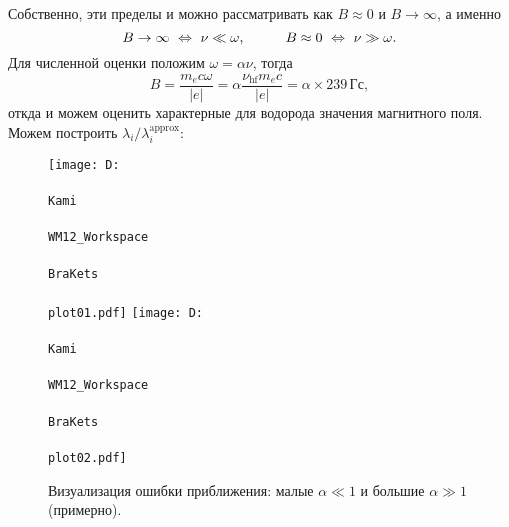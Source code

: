 Собственно, эти пределы и можно рассматривать как $B \approx 0$ и $B \to \infty$, а именно
\begin{equation*}
    B \to \infty \ \Leftrightarrow \ \nu \ll \omega,
    \hspace{10 mm} 
    B \approx 0 \  \Leftrightarrow \ \nu \gg \omega.
\end{equation*}
Для численной оценки положим $\omega = \alpha \nu$, тогда
\begin{equation*}
    B = \frac{m_e c \omega}{|e|} = \alpha \frac{\nu_{\text{hf}} m_e c}{|e|} = \alpha \times 239\, \text{Гс},
\end{equation*}
откда и можем оценить характерные для водорода значения магнитного поля. 
Можем построить $\lambda_i / \lambda_i^{\text{approx}}$:
\begin{figure}[h]
    \centering
    \texttt{[image: D:\\\\Kami\\\\WM12\_Workspace\\\\BraKets\\\\plot01.pdf]}
    \texttt{[image: D:\\\\Kami\\\\WM12\_Workspace\\\\BraKets\\\\plot02.pdf]}
    \caption{Визуализация ошибки приближения: малые $\alpha \ll 1$ и большие $\alpha \gg 1$ (примерно).}
\end{figure}




